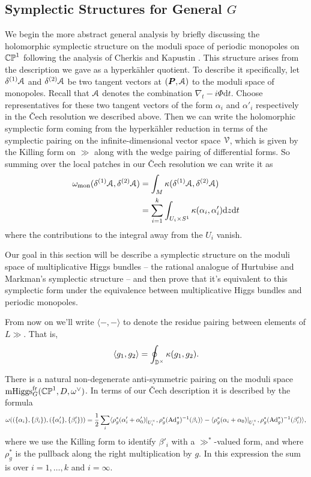 \documentclass[10pt, oneside]{article}
\DeclareMathOperator{\mhiggs}{mHiggs}
\renewcommand{\d}{\mathrm{d}}
\newcommand{\fr}{\mathrm{fr}}
\newcommand{\Ad}{\mr{Ad}}
\begin{document}
\subsection{Symplectic Structures for General $G$} \label{general_symplectic_sec}
We begin the more abstract general analysis by briefly discussing the holomorphic symplectic structure on the moduli space of periodic monopoles on $\mathbb{CP}^1$ following the analysis of Cherkis and Kapustin \cite{CherkisKapustin1, CherkisKapustin3}.  This structure arises from the description we gave as a hyperk\"ahler quotient.  To describe it specifically, let $\delta^{(1)} \mathcal{A}$ and $\delta^{(2)} \mathcal{A}$ be two tangent vectors at $(\boldsymbol{P}, \mathcal{A})$ to the moduli space of monopoles.  Recall that $\mathcal{A}$ denotes the combination $\nabla_t - i\Phi \d t$.  Choose representatives for these two tangent vectors of the form $\alpha_i$ and $\alpha'_i$ respectively  in the \v Cech resolution we described above.  Then we can write the holomorphic symplectic form coming from the hyperk\"ahler reduction in terms of the symplectic pairing on the infinite-dimensional vector space $\mathcal{V}$, which is given by the Killing form on $\gg$ along with the wedge pairing of differential forms.  So summing over the local patches in our \v Cech resolution we can write it as
\begin{align*}
\omega_{\mr{mon}}(\delta^{(1)} \mc A, \delta^{(2)} \mc A) &= \int_{M} \kappa(\delta^{(1)} \mc A, \delta^{(2)} \mc A) \\
&= \sum_{i=1}^k \int_{U_i \times S^1} \kappa(\alpha_i, \alpha'_i) \d z \d t
\end{align*}
where the contributions to the integral away from the $U_i$ vanish.

Our goal in this section will be describe a symplectic structure on the moduli space of multiplicative Higgs bundles -- the rational analogue of Hurtubise and Markman's symplectic structure -- and then prove that it's equivalent to this symplectic form under the equivalence between multiplicative Higgs bundles and periodic monopoles.

\begin{remark}
From now on we'll write $\langle - , - \rangle$ to denote the residue pairing between elements of $L\gg$.  That is, 
\[\langle g_1, g_2 \rangle = \oint_{\mathbb{D}^\times} \kappa(g_1, g_2).\]
\end{remark}

\begin{lemma} \label{sym_nondegeneracy_lemma}
There is a natural non-degenerate anti-symmetric pairing on the moduli space $\mhiggs_G^{\fr}(\bb{CP}^1,D,\omega^\vee)$.  In terms of our \v Cech description it is described by the formula 
\[\omega((\{\alpha_i\}, \{\beta_i\}), (\{\alpha'_i\},\{\beta_i'\})) = \frac 12 \sum_i \langle \rho_g^*(\alpha'_i + \alpha'_0)|_{U^\times_i}, \rho_g^*(\Ad_g^*)^{-1}(\beta_i) \rangle - \langle \rho_g^*(\alpha_i + \alpha_0)|_{U^\times_i}, \rho_g^*(\Ad_g^*)^{-1}(\beta'_i) \rangle,\]
where we use the Killing form to identify $\beta'_i$ with a $\gg^*$-valued form, and where $\rho_g^*$ is the pullback along the right multiplication by $g$.  In this expression the sum is over $i=1,\ldots,k$ and $i=\infty$.
\end{lemma}
\end{document}
